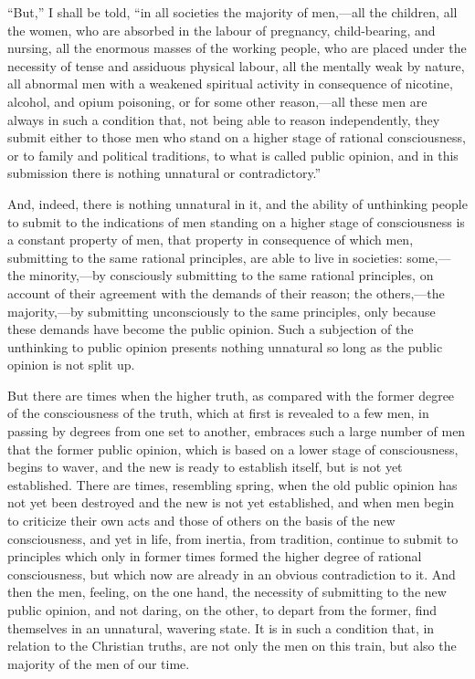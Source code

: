 \documentclass{book}
\begin{document}
“But,” I shall be told, “in all societies the majority of men,—all the children, all the women, who are absorbed in the labour of pregnancy, child-bearing, and nursing, all the enormous masses of the working people, who are placed under the necessity of tense and assiduous physical labour, all the mentally weak by nature, all abnormal men with a weakened spiritual activity in consequence of nicotine, alcohol, and opium poisoning, or for some other reason,—all these men are always in such a condition that, not being able to reason independently, they submit either to those men who stand on a higher stage of rational consciousness, or to family and political traditions, to what is called public opinion, and in this submission there is nothing unnatural or contradictory.”

And, indeed, there is nothing unnatural in it, and the ability of unthinking people to submit to the indications of men standing on a higher stage of consciousness is a constant property of men, that property in consequence of which men, submitting to the same rational principles, are able to live in societies: some,—the minority,—by consciously submitting to the same rational principles, on account of their agreement with the demands of their reason; the others,—the majority,—by submitting unconsciously to the same principles, only because these demands have become the public opinion. Such a subjection of the unthinking to public opinion presents nothing unnatural so long as the public opinion is not split up.

But there are times when the higher truth, as compared with the former degree of the consciousness of the truth, which at first is revealed to a few men, in passing by degrees from one set to another, embraces such a large number of men that the former public opinion, which is based on a lower stage of consciousness, begins to waver, and the new is ready to establish itself, but is not yet established. There are times, resembling spring, when the old public opinion has not yet been destroyed and the new is not yet established, and when men begin to criticize their own acts and those of others on the basis of the new consciousness, and yet in life, from inertia, from tradition, continue to submit to principles which only in former times formed the higher degree of rational consciousness, but which now are already in an obvious contradiction to it. And then the men, feeling, on the one hand, the necessity of submitting to the new public opinion, and not daring, on the other, to depart from the former, find themselves in an unnatural, wavering state. It is in such a condition that, in relation to the Christian truths, are not only the men on this train, but also the majority of the men of our time.
\end{document}
